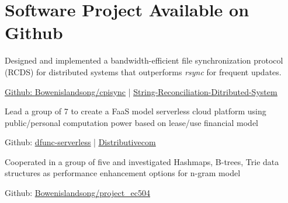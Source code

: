 \documentclass[]{deedy-resume-openfont}
\begin{document}
\hfill
\begin{minipage}[t]{0.66\textwidth} 


\section{Software Project Available on Github}

\vspace{\topsep} %
\begin{tightemize}
\item Designed and implemented a bandwidth-efficient file synchronization protocol (RCDS) for distributed systems that outperforms \emph{rsync} for frequent updates.
\item \href{https://github.com/Bowenislandsong/cpisync.git}{Github: \underline{Bowenislandsong/cpisync}} | \href{https://github.com/String-Reconciliation-Ditributed-System}{ \underline{String-Reconciliation-Ditributed-System}}
\end{tightemize}
\sectionsep

\begin{tightemize}
\item Lead a group of 7 to create a FaaS model serverless cloud platform using public/personal computation power based on lease/use financial model
\item Github: \href{https://github.com/dfunc-serverless}{\underline{dfunc-serverless}} | \href{https://github.com/Bowenislandsong/Distributivecom}{\underline{Distributivecom}}
\end{tightemize}
\sectionsep

\begin{tightemize}
\item Cooperated in a group of five and investigated Hashmaps, B-trees, Trie data structures as performance enhancement options for n-gram model
\item Github: \href{https://github.com/Bowenislandsong/project_ec504}{\underline{Bowenislandsong/project\_ec504}}
\end{tightemize}
\sectionsep


\end{minipage}
\end{document}
